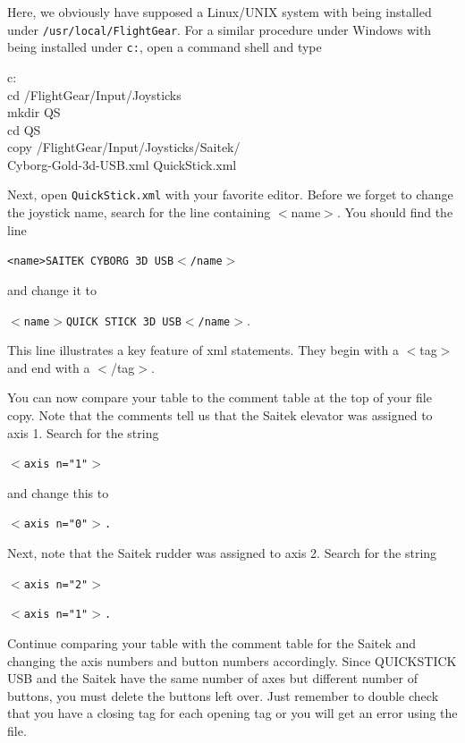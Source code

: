 \noindent
Here, we obviously have supposed a Linux/UNIX system with \FlightGear{} being installed under \texttt{/usr/local/FlightGear}. For a similar procedure under Windows with \FlightGear{} being installed under \texttt{c:\FlightGear}, open a command shell and type
\medskip

\begin{ttfamily}
\noindent
c:\\
cd /FlightGear/Input/Joysticks\\
mkdir QS\\
cd QS\\
copy  /FlightGear/Input/Joysticks/Saitek/\\
Cyborg-Gold-3d-USB.xml  QuickStick.xml
\end{ttfamily}
\medskip

\noindent
Next, open \texttt{QuickStick.xml} with your favorite editor.  Before we forget to change the joystick name, search for the line containing $<$name$>$.  You should find the line
\medskip

\texttt{<name>SAITEK CYBORG 3D USB$<$/name$>$}
\medskip

\noindent
and change it to
\medskip

	\texttt{$<$name$>$QUICK STICK 3D USB$<$/name$>$}.
	\medskip

\noindent
This line illustrates a key feature of xml statements.  They begin with a $<$tag$>$ and end with a $<$/tag$>$.  

You can now compare your table to the comment table at the top of your file copy.  Note that the comments tell us that the Saitek elevator was assigned to axis 1.  Search for the string
\medskip

	\texttt{$<$axis n="1"$>$}
\medskip

\noindent	
and change this to 
\medskip

	\texttt{$<$axis n="0"$>$.}
\medskip	

Next, note that the Saitek rudder was assigned to axis 2.  Search for the string
\medskip

	\texttt{$<$axis n="2"$>$}
	
	\texttt{$<$axis n="1"$>$.}
\medskip

\noindent	
Continue comparing your table with the comment table for the Saitek and changing the axis numbers and button numbers accordingly.  Since QUICKSTICK USB and the Saitek have the same number of axes but different number of buttons, you must delete the buttons left over.  Just remember to double check that you have a closing tag for each opening tag or you will get an error using the file.

